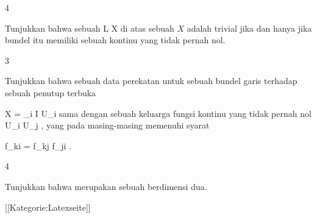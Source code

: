 {4}
{

Tunjukkan bahwa sebuah
\maabb {} { L } { X
} {}
di atas sebuah
$X$ adalah trivial jika dan hanya jika bundel itu memiliki sebuah
kontinu yang tidak pernah nol.

}
{} {}

{3}
{

Tunjukkan bahwa sebuah data perekatan untuk sebuah bundel garis terhadap sebuah penutup terbuka

\mavergleichskette
{\vergleichskette
{X
}
{ = }{ \bigcup_{i \in I} U_i
}
{  }{
}
{    }{
}
{   }{
}
}
{}{}{}
sama dengan sebuah keluarga fungsi kontinu yang tidak pernah nol
 {U_i \cap U_j } { \R
} {,}
yang pada
 masing-masing memenuhi syarat

\mavergleichskette
{\vergleichskette
{ f_{ki}
}
{ = }{ f_{kj} \cdot f_{ji}
}
{  }{
}
{    }{
}
{   }{
}
}
{}{}{.}

}
{} {}

{4}
{

Tunjukkan bahwa
merupakan sebuah
berdimensi dua.

}
{} {}

 [[Kategorie:Latexseite]]
